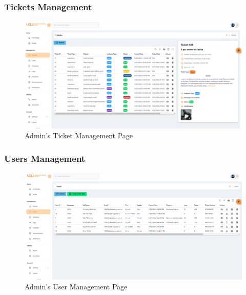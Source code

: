 	\subsubsection{Tickets Management}
	\begin{figure}[H]
		\centering
		\includegraphics[width=1\linewidth]{graphics/gui/admin/ticket-mng}
		\caption{Admin's Ticket Management Page}
		\label{fig:gui-ad-ticket-mng}
	\end{figure}
	
	
	\subsubsection{Users Management}
	\begin{figure}[H]
		\centering
		\includegraphics[width=1\linewidth]{graphics/gui/admin/user-mng}
		\caption{Admin's User Management Page}
		\label{fig:gui-ad-user-mng}
	\end{figure}
	
